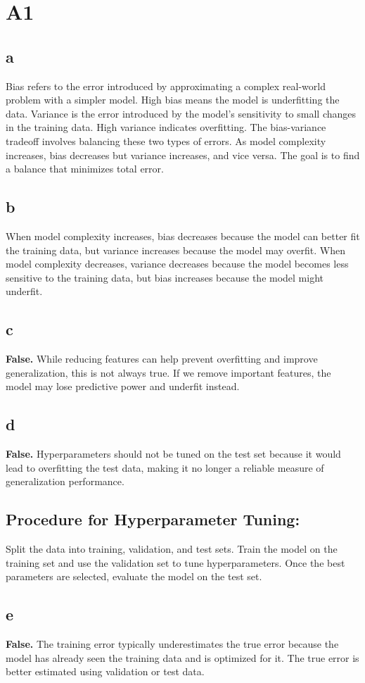 \documentclass{article}
\begin{document}
\section*{A1}

\subsection*{a}
Bias refers to the error introduced by approximating a complex real-world problem with a simpler model. High bias means the model is underfitting the data.  
Variance is the error introduced by the model’s sensitivity to small changes in the training data. High variance indicates overfitting. The bias-variance tradeoff involves balancing these two types of errors. As model complexity increases, bias decreases but variance increases, and vice versa. The goal is to find a balance that minimizes total error.

\subsection*{b}
When model complexity increases, bias decreases because the model can better fit the training data, but variance increases because the model may overfit.  
When model complexity decreases, variance decreases because the model becomes less sensitive to the training data, but bias increases because the model might underfit.

\subsection*{c}
\textbf{False.} While reducing features can help prevent overfitting and improve generalization, this is not always true. If we remove important features, the model may lose predictive power and underfit instead.

\subsection*{d}
\textbf{False.} Hyperparameters should not be tuned on the test set because it would lead to overfitting the test data, making it no longer a reliable measure of generalization performance. 

\subsection*{Procedure for Hyperparameter Tuning:}
Split the data into training, validation, and test sets. Train the model on the training set and use the validation set to tune hyperparameters. Once the best parameters are selected, evaluate the model on the test set.

\subsection*{e}
\textbf{False.} The training error typically underestimates the true error because the model has already seen the training data and is optimized for it. The true error is better estimated using validation or test data.
\end{document}
